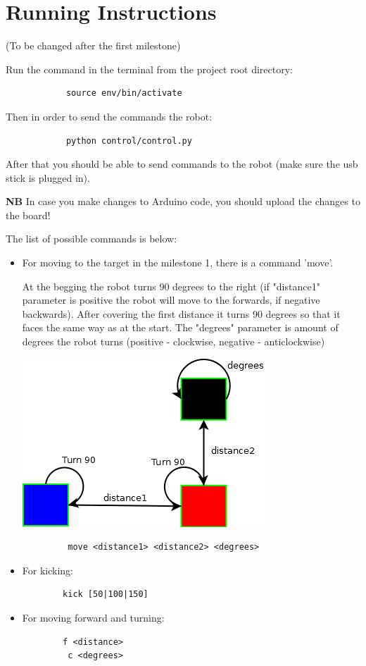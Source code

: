 \documentclass[12pt]{article}
\begin{document}
\section{Running Instructions} 
   (To be changed after the first milestone)
   \bigskip 
   
   Run the command in the terminal from the project root directory: 
			\begin{lstlisting}
			source env/bin/activate
			\end{lstlisting}
   Then in order to send the commands the robot: 
			\begin{lstlisting}
			python control/control.py
			\end{lstlisting}
   After that you should be able to send commands to the robot (make sure the usb stick is plugged in).
   \bigskip
   
   \textbf{NB} In case you make changes to Arduino code, you should upload the changes to the board!
   \bigskip
   
   The list of possible commands is below:
	\bigskip
	\begin{itemize}
  \item For moving to the target in the milestone 1, there is a command 'move'.
  \bigskip
  
	At the begging the robot turns 90 degrees to the right (if "distance1" parameter is positive the robot will move to the forwards, if negative backwards). After covering the first distance it turns 90 degrees so that it faces the same way as at the start. The "degrees" parameter is amount of degrees the robot turns (positive - clockwise, negative - anticlockwise)
	\bigskip
	
		\includegraphics{Diagram1}
		
		\begin{lstlisting}
		 move <distance1> <distance2> <degrees>
		\end{lstlisting}
\newpage

 	  \item For kicking:
		\begin{lstlisting}
	    kick [50|100|150]
		\end{lstlisting}
	\item For moving forward and turning:
		\begin{lstlisting}
	    f <distance>
		 c <degrees>
		\end{lstlisting}
\end{itemize}
		
\end{document}
